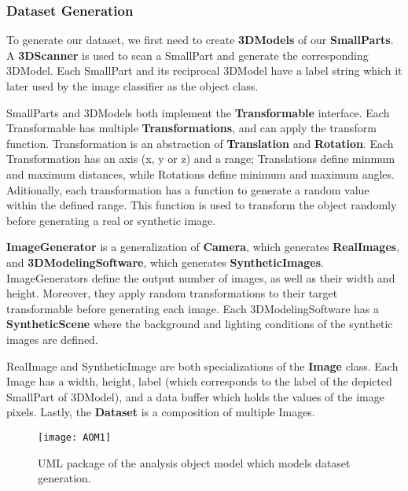 \subsubsection{Dataset Generation}
To generate our dataset, we first need to create \textbf{3DModels} of our \textbf{SmallParts}. A \textbf{3DScanner} is used to scan a SmallPart and generate the corresponding 3DModel. Each SmallPart and its reciprocal 3DModel have a label string which it later used by the image classifier as the object class.

SmallParts and 3DModels both implement the \textbf{Transformable} interface. Each Transformable has multiple \textbf{Transformations}, and can apply the transform function. Transformation is an abstraction of \textbf{Translation} and \textbf{Rotation}. Each Transformation has an axis (x, y or z) and a range; Translations define minmum and maximum distances, while Rotations define minimum and maximum angles. Aditionally, each transformation has a function to generate a random value within the defined range. This function is used to transform the object randomly before generating a real or synthetic image.

\textbf{ImageGenerator} is a generalization of \textbf{Camera}, which generates \textbf{RealImages}, and \textbf{3DModelingSoftware}, which generates \textbf{SyntheticImages}. ImageGenerators define the output number of images, as well as their width and height. Moreover, they apply random transformations to their target transformable before generating each image. Each 3DModelingSoftware has a \textbf{SyntheticScene} where the background and lighting conditions of the synthetic images are defined.

RealImage and SyntheticImage are both specializations of the \textbf{Image} class. Each Image has a width, height, label (which corresponds to the label of the depicted SmallPart of 3DModel), and a data buffer which holds the values of the image pixels. Lastly, the \textbf{Dataset} is a composition of multiple Images.

\begin{figure}[H]
\centering
  \texttt{[image: AOM1]}
\caption{UML package of the analysis object model which models dataset generation.}
\label{fig:AOM1}
\end{figure}

